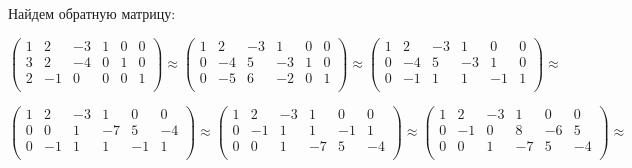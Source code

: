 \documentclass[a4paper]{article}
\begin{document}
Найдем обратную матрицу:

\begin{equation*}
 \left(\begin{array}{rrr|rrr}
  1 & 2 & -3 & 1 & 0 & 0\\
3 & 2 & -4& 0 & 1 & 0\\
2 & -1 & 0 & 0 & 0 & 1\\
   \end{array}\right)
   \approx
 \left(\begin{array}{rrr|rrr}
1 & 2 & -3 & 1 & 0 & 0\\
0 & -4 & 5& -3 & 1 & 0\\
0 & -5 & 6 & -2 & 0 & 1\\
   \end{array}\right)
\approx
 \left(\begin{array}{rrr|rrr}
1 & 2 & -3 & 1 & 0 & 0\\
0 & -4 & 5& -3 & 1 & 0\\
0 & -1 & 1 & 1 & -1 & 1\\
   \end{array}\right)
  \approx
\end{equation*}

\begin{equation*}
 \left(\begin{array}{rrr|rrr}
1 & 2 & -3 & 1 & 0 & 0\\
0 & 0 & 1& -7 & 5 & -4\\
0 & -1 & 1 & 1 & -1 & 1\\
   \end{array}\right)
   \approx
 \left(\begin{array}{rrr|rrr}
1 & 2 & -3 & 1 & 0 & 0\\
0 & -1 & 1 & 1 & -1 & 1\\
0 & 0 & 1& -7 & 5 & -4\\
   \end{array}\right)
\approx
 \left(\begin{array}{rrr|rrr}
1 & 2 & -3 & 1 & 0 & 0\\
0 & -1 & 0 & 8 & -6 & 5\\
0 & 0 & 1& -7 & 5 & -4\\
   \end{array}\right)
  \approx
\end{equation*}
\end{document}
